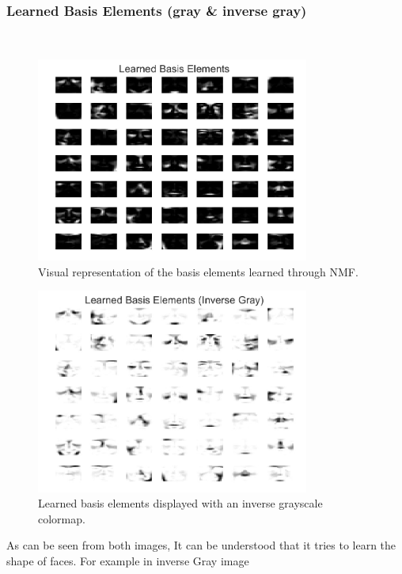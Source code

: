 \documentclass[journal,12pt,onecolumn,draftclsnofoot]{IEEEtran}
\begin{document}
\subsubsection*{Learned Basis Elements (gray \& inverse gray)}
\mbox{}\\
\begin{figure}[H]
    \centering
    \includegraphics[width=0.8\textwidth]{images/Learned_BasisElements.jpeg}
    \caption{Visual representation of the basis elements learned through NMF.}
    \label{fig:learned_basis_elements}
\end{figure}

\begin{figure}[H]
    \centering
    \includegraphics[width=0.8\textwidth]{images/Learned_BasisElements_Inverse.jpeg}
    \caption{Learned basis elements displayed with an inverse grayscale colormap.}
    \label{fig:learned_basis_elements_inverse}
\end{figure}
As can be seen from both images, It can be understood that it tries to learn the shape of faces. For example in inverse Gray image
\end{document}
